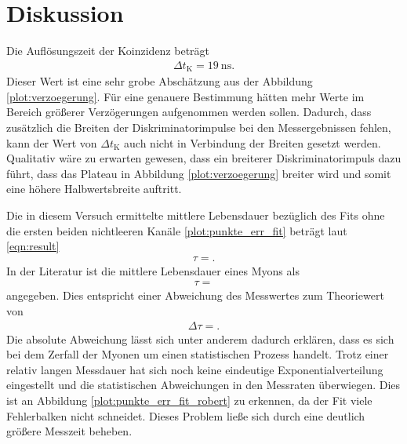 \section{Diskussion}
\label{sec:Diskussion}

Die Auflösungszeit der Koinzidenz beträgt
\begin{align*}
  \Delta t_\text{K} = \SI{19}{\nano\second}.
\end{align*}
Dieser Wert ist eine sehr grobe Abschätzung aus der Abbildung \ref{plot:verzoegerung}.
Für eine genauere Bestimmung hätten mehr Werte im Bereich größerer Verzögerungen aufgenommen werden sollen.
Dadurch, dass zusätzlich die Breiten der Diskriminatorimpulse bei den Messergebnissen fehlen, kann der Wert von $\Delta t_\text{K}$ auch nicht in Verbindung der Breiten gesetzt werden.
Qualitativ wäre zu erwarten gewesen, dass ein breiterer Diskriminatorimpuls dazu führt, dass das Plateau in Abbildung \ref{plot:verzoegerung} breiter wird und somit eine höhere Halbwertsbreite auftritt. %

Die in diesem Versuch ermittelte mittlere Lebensdauer bezüglich des Fits ohne die ersten beiden nichtleeren Kanäle \ref{plot:punkte_err_fit} beträgt laut \eqref{eqn:result}
\begin{align*}
  \tau = .
\end{align*}
In der Literatur \cite{Agashe:2014kda} ist die mittlere Lebensdauer eines Myons als
\begin{align*}
  \tau = 
\end{align*}
angegeben.
Dies entspricht einer Abweichung des Messwertes zum Theoriewert von
\begin{align*}
  \Delta \tau = .
\end{align*}
Die absolute Abweichung lässt sich unter anderem dadurch erklären, dass es sich bei dem Zerfall der Myonen um einen statistischen Prozess handelt.
Trotz einer relativ langen Messdauer hat sich noch keine eindeutige Exponentialverteilung eingestellt und die statistischen Abweichungen in den Messraten überwiegen.
Dies ist an Abbildung \ref{plot:punkte_err_fit_robert} zu erkennen, da der Fit viele Fehlerbalken nicht schneidet.
Dieses Problem ließe sich durch eine deutlich größere Messzeit beheben.\\

